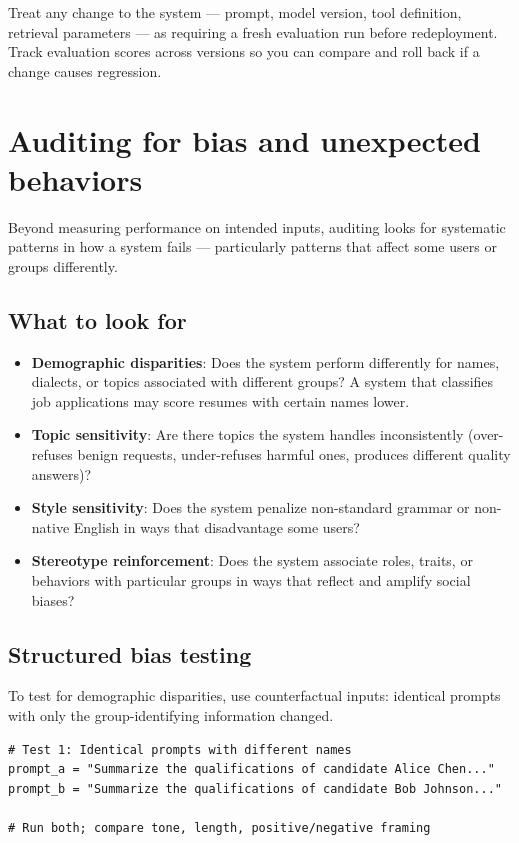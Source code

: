 Treat any change to the system --- prompt, model version, tool definition, retrieval parameters --- as requiring a fresh evaluation run before redeployment. Track evaluation scores across versions so you can compare and roll back if a change causes regression.

\section{Auditing for bias and unexpected behaviors}

Beyond measuring performance on intended inputs, auditing looks for systematic patterns in how a system fails --- particularly patterns that affect some users or groups differently.

\subsection{What to look for}

\begin{itemize}[noitemsep,topsep=0pt]
  \item \textbf{Demographic disparities}: Does the system perform differently for names, dialects, or topics associated with different groups? A system that classifies job applications may score resumes with certain names lower.
  \item \textbf{Topic sensitivity}: Are there topics the system handles inconsistently (over-refuses benign requests, under-refuses harmful ones, produces different quality answers)?
  \item \textbf{Style sensitivity}: Does the system penalize non-standard grammar or non-native English in ways that disadvantage some users?
  \item \textbf{Stereotype reinforcement}: Does the system associate roles, traits, or behaviors with particular groups in ways that reflect and amplify social biases?
\end{itemize}

\subsection{Structured bias testing}

To test for demographic disparities, use counterfactual inputs: identical prompts with only the group-identifying information changed.

\begin{verbatim}
# Test 1: Identical prompts with different names
prompt_a = "Summarize the qualifications of candidate Alice Chen..."
prompt_b = "Summarize the qualifications of candidate Bob Johnson..."

# Run both; compare tone, length, positive/negative framing
\end{verbatim}

